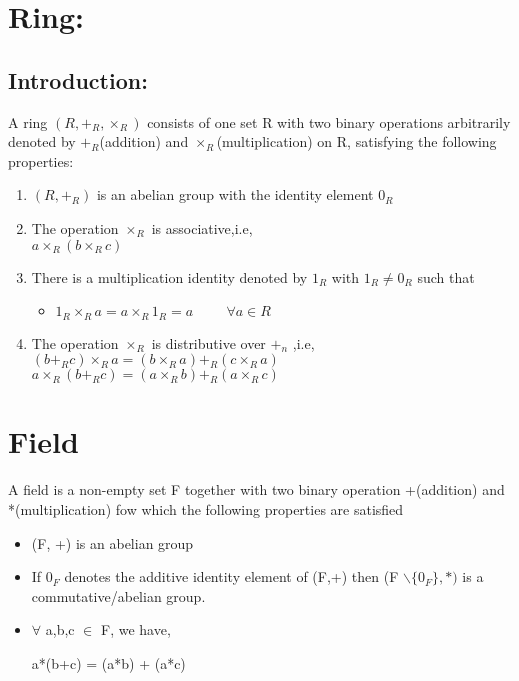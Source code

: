 \documentclass[11pt]{article}
\begin{document}
\section{Ring:}
\subsection{Introduction:}
A ring $(R, +_R, \times_R)$ consists of one set R with two binary operations arbitrarily denoted by $+_R$(addition) and $\times_R$(multiplication) on R, satisfying the following properties: 
\begin{enumerate}
    \item $(R, +_R)$ is an abelian group with the identity element $0_R$
    \item The operation $\times_R$ is associative,i.e, \\
    $a \times_R (b \times_R c) $
    \item There is a multiplication identity denoted by $1_R$ with  $1_R \ne 0_R$ such that\\
    \begin{itemize}
        \item $1_R \times_R a = a \times_R 1_R = a \hspace{1cm} \forall a \in R$
    \end{itemize}
    \item The operation $\times_R$ is distributive over $+_n$ ,i.e,\\
    $(b +_R c) \times_R a = (b \times_R a) +_R (c \times_R a)$ \\
    $a \times_R (b +_R c) = (a \times_R b) +_R (a \times_R c)$ \\
\end{enumerate}






\section*{Field}
A field is a non-empty set F together with two binary operation +(addition) and *(multiplication) fow which the following properties are satisfied
\begin{itemize}
    \item (F, +) is an abelian group
    \item If $0_F$ denotes the additive identity element of (F,+) then (F $\backslash \{0_F\}, *) $ is a commutative/abelian group.
    \item $\forall$ a,b,c $\in$ F, we have,
    \begin{center}
        a*(b+c) = (a*b) + (a*c)
    \end{center}
\end{itemize}
\end{document}
